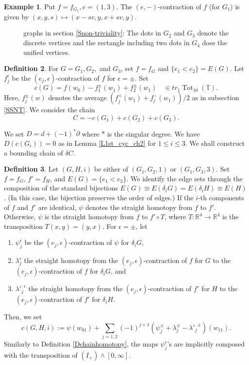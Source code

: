 \documentclass[reqno]{amsart}
\theoremstyle{definition}
\newtheorem{defi}{Definition}[section]
\newtheorem{exa}[defi]{Example}
\theoremstyle{plain}
\newcommand{\eps}{\epsilon}
\newcommand{\TTH}{\mathbb{T}}%
\newcommand{\tot}{\operatorname{Tot}}%
\newcommand{\RR}{\mathbb{R}}
\begin{document}
\begin{exa}\label{E(e,-)-cont}
Put $f=f_{G_1}, e=(1,3)$. The $(e,-)$-contraction of $f$ (for $G_1$) is given by  
$(x,y,s)\mapsto (x-sv,y,x+sv,y)$.
\end{exa}
\begin{figure}
\begin{center}

\end{center}
\caption{graphs in section \ref{Snon-triviality}: The dots in $G_2$ and $G_3$ denote the discrete vertices and the rectangle including two dots in $G_4$ does the unified vertices. } \label{Fgraphs_3term}
\end{figure}
\begin{defi}\label{Dchain_3term}
For $G=G_1,G_2,$ and $G_3$, set $f=f_G$ and $\{e_1<e_2\}=E(G)$.  Let $f^{\eps}_j$ be the $(e_j,\eps)$-contraction of $f$ for $\eps=\pm$. Set
\[
c(G)=f(w_0)-f^{\pm}_1(w_1)+f^\pm_2(w_1)\quad \in tr_1\tot_{10}(\TTH).
\]
Here, $f^{\pm}_j(w)$ denotes the average $(f^+_j(w_1)+f^-_j(w_1))/2$ as in subsection \ref{SSNT}. We consider the chain
\[
C=-c(G_1)+c(G_2)+c(G_3).
\]
\end{defi}
We set $D=d+(-1)^*\partial$ where $*$ is the singular degree. We have $D(c(G_i))=0$ as in Lemma \ref{L1st_cyc_ch2} for $1\leq i\leq 3$. We shall construct a bounding chain of $\delta C$. 
\begin{defi}\label{Dchain_2graphs_3term}
Let $(G, H,i)$ be either of $
(G_1,G_2,1)$ or  $(G_1,G_3,3)$.
Set $f=f_G$, $f'=f_H$, and $E(G)=\{e_1<e_2\}$. We identify  the edge sets through the composition of the standard bijections $E(G)\cong E(\delta_iG)= E(\delta_iH)\cong E(H)$. (In this case, the bijection preserves the order of edges.) 
 If the $i$-th components of $f$ and $f'$ are identical, $\psi$ denotes the straight homotopy from $f$ to $f'$. Otherwise, $\psi$ is the straight homotopy from $f$ to $f'\circ T$, where $T:\RR^4\to \RR^4$ is the transposition $T(x,y)=(y,x)$. For $\eps=\pm$, let
\begin{enumerate}
\item $\psi_j^\eps$  be the $(e_j,\eps)$-contraction of $\psi$ for $\delta_iG$,
\item $\lambda_j^\eps$  the straight homotopy from the $(e_j,\eps)$-contraction  of $f$ for $G$ to the $(e_j,\eps)$-contraction  of $f$ for $\delta_iG$, and
\item ${\lambda'_j}^\eps$ the straight homotopy from the $(e_j,\eps)$-contraction of $f'$ for $H$ to the $(e_j,\eps)$-contraction of $f'$ for $\delta_iH$.
\end{enumerate}
Then, we set 
\[
c(G,H,i):=\psi(w_{01})+\sum_{ j=1,2}(-1)^{j+1}(\psi^{\pm}_j+\lambda^{\pm}_j-{\lambda'_j}^\pm)(w_{11}).
\]Similarly to Definition \ref{Dchainhomotopy}, the maps $\psi^\eps_j$'s are implicitly composed with the  transposition of $(I_+)\wedge [0,\infty]$.
\end{defi}
\end{document}
